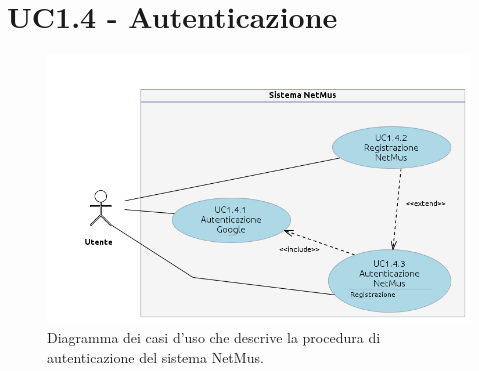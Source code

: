 \section{UC1.4 - Autenticazione}
\begin{figure}[h]
  \centering
  \includegraphics[width=15cm]{img/AR/UC1_4.png}
\caption{Diagramma dei casi d'uso che descrive la procedura di autenticazione
del sistema NetMus.}
\end{figure}


